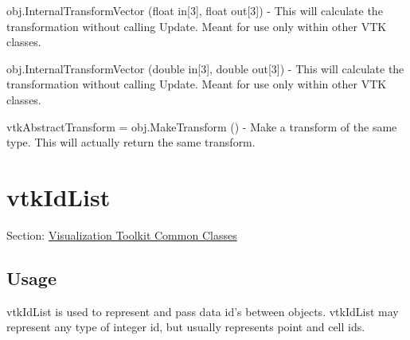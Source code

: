 \begin{DoxyItemize}
\item {\ttfamily obj.\-Internal\-Transform\-Vector (float in\mbox{[}3\mbox{]}, float out\mbox{[}3\mbox{]})} -\/ This will calculate the transformation without calling Update. Meant for use only within other V\-T\-K classes.  
\item {\ttfamily obj.\-Internal\-Transform\-Vector (double in\mbox{[}3\mbox{]}, double out\mbox{[}3\mbox{]})} -\/ This will calculate the transformation without calling Update. Meant for use only within other V\-T\-K classes.  
\item {\ttfamily vtk\-Abstract\-Transform = obj.\-Make\-Transform ()} -\/ Make a transform of the same type. This will actually return the same transform.  
\end{DoxyItemize}\hypertarget{vtkcommon_vtkidlist}{}\section{vtk\-Id\-List}\label{vtkcommon_vtkidlist}
Section\-: \hyperlink{sec_vtkcommon}{Visualization Toolkit Common Classes} \hypertarget{vtkwidgets_vtkxyplotwidget_Usage}{}\subsection{Usage}\label{vtkwidgets_vtkxyplotwidget_Usage}
vtk\-Id\-List is used to represent and pass data id's between objects. vtk\-Id\-List may represent any type of integer id, but usually represents point and cell ids.

